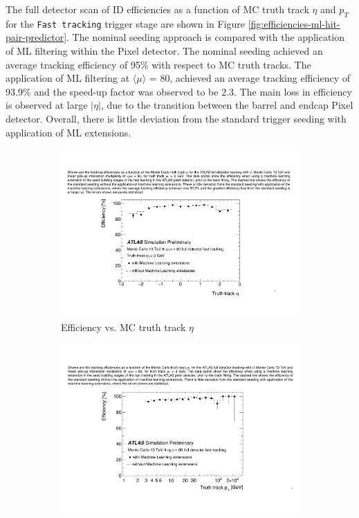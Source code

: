 The full detector scan of ID efficiencies as a function of MC truth track $\eta$ and $p_T$ for the \texttt{Fast tracking} trigger stage are shown in Figure \ref{fig:efficiencies-ml-hit-pair-predictor}. The nominal seeding approach is compared with the application of ML filtering within the Pixel detector. The nominal seeding achieved an average tracking efficiency of 95\% with respect to MC truth tracks. The application of ML filtering at $\langle \mu \rangle$ = 80, achieved an average tracking efficiency of 93.9\% and the speed-up factor was observed to be 2.3. The main loss in efficiency is observed at large $\lvert \eta \rvert$, due to the transition between the barrel and endcap Pixel detector. Overall, there is little deviation from the standard trigger seeding with application of ML extensions.


\begin{figure}[!htbp]
\centering
    \begin{subfigure}[a]{0.86\textwidth}
        \includegraphics[width=\linewidth]{images/4-ml-based-predictor/efficiency_eta.pdf}
        \caption{Efficiency vs. MC truth track $\eta$}
    \label{fig:efficiencies-ml-hit-pair-predictor-eta}
    \end{subfigure}
    \hfill
    \begin{subfigure}[b]{0.86\textwidth}
        \centering
        \includegraphics[width=\linewidth]{images/4-ml-based-predictor/efficiency_pT.pdf}

\end{subfigure}
\end{figure}
